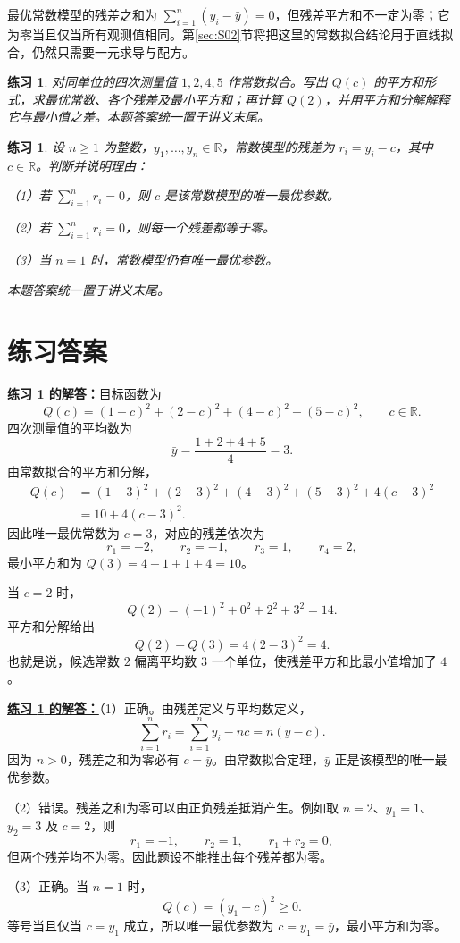 \documentclass[UTF8,fontset=fandol,11pt]{ctexart}
\newtheorem{exercise}[definition]{练习}
\begin{document}
最优常数模型的残差之和为 $\sum_{i=1}^{n}(y_i-\bar{y})=0$，但残差平方和不一定为零；它为零当且仅当所有观测值相同。第\ref{sec:S02}节将把这里的常数拟合结论用于直线拟合，仍然只需要一元求导与配方。\par
\begin{exercise}
\label{mathagent:exercise:79e91357ee05b8b9aa4c657d553157f1ef411624d282c3f2337dd0e01453ce2d}
对同单位的四次测量值 $1,2,4,5$ 作常数拟合。写出 $Q(c)$ 的平方和形式，求最优常数、各个残差及最小平方和；再计算 $Q(2)$，并用平方和分解解释它与最小值之差。本题答案统一置于讲义末尾。
\end{exercise}
\begin{exercise}
\label{mathagent:exercise:9e7dbf7ef17df1506f236bbf1ad6ff8c14ff13065df89e12b796d18475228be7}
设 $n\geq1$ 为整数，$y_1,\ldots,y_n\in\mathbb{R}$，常数模型的残差为 $r_i=y_i-c$，其中 $c\in\mathbb{R}$。判断并说明理由：

（1）若 $\sum_{i=1}^{n}r_i=0$，则 $c$ 是该常数模型的唯一最优参数。

（2）若 $\sum_{i=1}^{n}r_i=0$，则每一个残差都等于零。

（3）当 $n=1$ 时，常数模型仍有唯一最优参数。

本题答案统一置于讲义末尾。
\end{exercise}
\section*{练习答案}
\par\noindent\textbf{\hyperref[mathagent:exercise:79e91357ee05b8b9aa4c657d553157f1ef411624d282c3f2337dd0e01453ce2d]{练习 \ref*{mathagent:exercise:79e91357ee05b8b9aa4c657d553157f1ef411624d282c3f2337dd0e01453ce2d} 的解答：}}目标函数为
\[
Q(c)=(1-c)^2+(2-c)^2+(4-c)^2+(5-c)^2,\qquad c\in\mathbb{R}.
\]
四次测量值的平均数为
\[
\bar{y}=\frac{1+2+4+5}{4}=3.
\]
由常数拟合的平方和分解，
\[
\begin{aligned}
Q(c)&=(1-3)^2+(2-3)^2+(4-3)^2+(5-3)^2+4(c-3)^2\\
&=10+4(c-3)^2.
\end{aligned}
\]
因此唯一最优常数为 $c=3$，对应的残差依次为
\[
r_1=-2,\qquad r_2=-1,\qquad r_3=1,\qquad r_4=2,
\]
最小平方和为 $Q(3)=4+1+1+4=10$。

当 $c=2$ 时，
\[
Q(2)=(-1)^2+0^2+2^2+3^2=14.
\]
平方和分解给出
\[
Q(2)-Q(3)=4(2-3)^2=4.
\]
也就是说，候选常数 $2$ 偏离平均数 $3$ 一个单位，使残差平方和比最小值增加了 $4$。\par
\par\noindent\textbf{\hyperref[mathagent:exercise:9e7dbf7ef17df1506f236bbf1ad6ff8c14ff13065df89e12b796d18475228be7]{练习 \ref*{mathagent:exercise:9e7dbf7ef17df1506f236bbf1ad6ff8c14ff13065df89e12b796d18475228be7} 的解答：}}（1）正确。由残差定义与平均数定义，
\[
\sum_{i=1}^{n}r_i=\sum_{i=1}^{n}y_i-nc=n(\bar{y}-c).
\]
因为 $n>0$，残差之和为零必有 $c=\bar{y}$。由常数拟合定理，$\bar{y}$ 正是该模型的唯一最优参数。

（2）错误。残差之和为零可以由正负残差抵消产生。例如取 $n=2$、$y_1=1$、$y_2=3$ 及 $c=2$，则
\[
r_1=-1,\qquad r_2=1,\qquad r_1+r_2=0,
\]
但两个残差均不为零。因此题设不能推出每个残差都为零。

（3）正确。当 $n=1$ 时，
\[
Q(c)=(y_1-c)^2\geq0.
\]
等号当且仅当 $c=y_1$ 成立，所以唯一最优参数为 $c=y_1=\bar{y}$，最小平方和为零。\par
\end{document}
